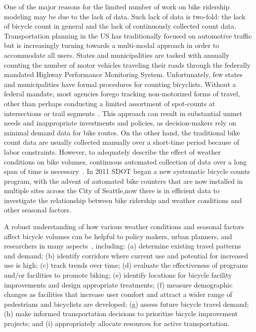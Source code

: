\documentclass [11pt, proquest] {uwthesis}[2015/03/03]
\begin{document}

One of the major reasons for the limited number of work on bike ridership modeling may be due to the lack of data. Such lack of data is two-fold: the lack of bicycle count in general and the lack of continuously collected count data. Transportation planning in the US has traditionally focused on automotive traffic but is increasingly turning towards a multi-modal approach in order to accommodate all users. States and municipalities are tasked with annually counting the number of motor vehicles traveling their roads through the federally mandated Highway Performance Monitoring System. Unfortunately, few states and municipalities have formal procedures for counting bicyclists. Without a federal mandate, most agencies forego tracking non-motorized forms of travel, other than perhaps conducting a limited assortment of spot-counts at intersections or trail segments~\cite{Kockelman16}. This approach can result in substantial unmet needs and inappropriate investments and policies, as decision-makers rely on minimal demand data for bike routes. On the other hand, the traditional bike count data are usually collected manually over a short-time period because of labor constraints. However, to adequately describe the effect of weather conditions on bike volumes, continuous automated collection of data over a long span of time is necessary~\cite{Miranda-Moreno:2011aa}. In 2011 SDOT began a new systematic bicycle counts program, with the advent of automated bike counters that are now installed in multiple sites across the City of Seattle,now there is in efficient data  to investigate the relationship between bike ridership and weather conditions and other seasonal factors.

A robust understanding of how various weather conditions and seasonal factors affect bicycle volumes can be helpful to policy makers, urban planners, and researchers in many aspects~\cite{LAManual}, including: (a) determine existing travel patterns and demand; (b) identify corridors where current use and potential for increased use is high; (c) track trends over time; (d) evaluate the effectiveness of programs and/or facilities to promote biking; (e) identify locations for bicycle facility improvements and design appropriate treatments; (f) measure demographic changes as facilities that increase user comfort and attract a wider range of pedestrians and bicyclists are developed; (g) assess future bicycle travel demand; (h) make informed transportation decisions to prioritize bicycle improvement projects; and (i) appropriately allocate resources for active transportation.
\end{document}
